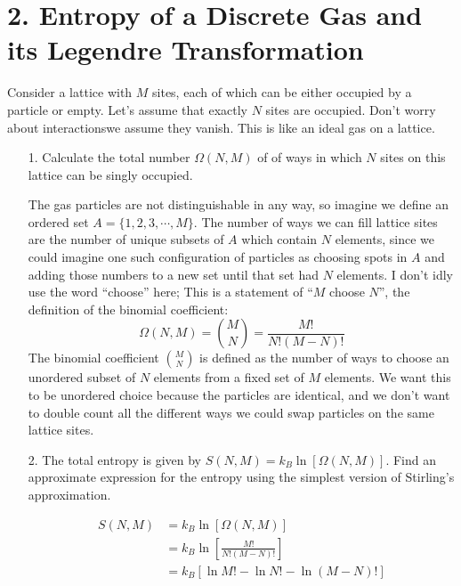 \documentclass[a4paper,twoside]{article}
\begin{document}
\section*{2. Entropy of a Discrete Gas and its Legendre Transformation}
Consider a lattice with $ M $ sites, each of which can be either occupied by a particle or empty. Let's assume that exactly $ N $ sites are occupied. Don't worry about interactions\textemdash we assume they vanish. This is like an ideal gas on a lattice.
\begin{itemize}
    \item[1.] Calculate the total number $ \Omega(N,M) $ of of ways in which $ N $ sites on this lattice can be singly occupied.
        \begin{problem}
            The gas particles are not distinguishable in any way, so imagine we define an ordered set $ A = \{1,2,3, \cdots, M\} $. The number of ways we can fill lattice sites are the number of unique subsets of $ A $ which contain $ N $ elements, since we could imagine one such configuration of particles as choosing spots in $ A $ and adding those numbers to a new set until that set had $ N $ elements. I don't idly use the word ``choose'' here; This is a statement of ``$ M $ choose $ N $'', the definition of the binomial coefficient:
            \begin{equation}
                \Omega(N, M) = \binom{M}{N} = \frac{M!}{N!(M-N)!}
            \end{equation}
            The binomial coefficient $ \binom{M}{N} $ is defined as the number of ways to choose an unordered subset of $ N $ elements from a fixed set of $ M $ elements. We want this to be unordered choice because the particles are identical, and we don't want to double count all the different ways we could swap particles on the same lattice sites.
        \end{problem}
    \item[2.] The total entropy is given by $ S(N,M) = k_B \ln[\Omega(N,M)] $. Find an approximate expression for the entropy using the simplest version of Stirling's approximation.
        \begin{problem}
            \begin{align}
                S(N, M) &= k_B \ln[\Omega(N,M)] \\
                &= k_B \ln\left[\frac{M!}{N!(M-N)!}\right] \\
                &= k_B \left[ \ln M! - \ln N! - \ln(M-N)! \right]
            \end{align}

\end{problem}
\end{itemize}
\end{document}

